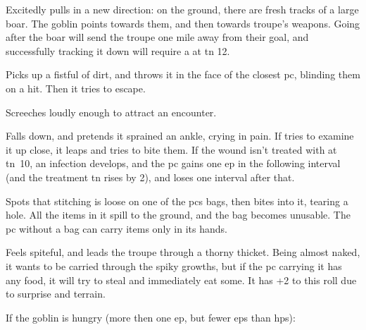 \documentclass[10pt,twoside]{book}
\begin{document}
\begin{dlist}
  \item
  Excitedly pulls in a new direction: on the ground, there are fresh tracks of a large boar.
  The goblin points towards them, and then towards troupe's weapons.
  Going after the boar will send the troupe one mile away from their goal, and successfully tracking it down will require a  at \gls{tn} 12.
  \item
  Picks up a fistful of dirt, and throws it in the face of the closest \gls{pc}, blinding them on a hit.
  Then it tries to escape.
  \item
  Screeches loudly enough to attract an encounter.
  \item
  Falls down, and pretends it sprained an ankle, crying in pain.
  If  tries to examine it up close, it leaps and tries to bite them.
  If the wound isn't treated with  at \gls{tn}~10, an infection develops, and the \gls{pc} gains one \gls{ep} in the following \gls{interval} (and the treatment \gls{tn} rises by 2), and loses  one \gls{interval} after that.
  \item
  Spots that stitching is loose on one of the \glspl{pc} bags, then bites into it, tearing a hole.
  All the items in it spill to the ground, and the bag becomes unusable.
  The \gls{pc} without a bag can carry items only in its hands.
  \item
  Feels spiteful, and leads the troupe through a thorny thicket.%
  Being almost naked, it wants to be carried through the spiky growths, but if the \gls{pc} carrying it has any food, it will try to steal and immediately eat some.
  It has +2 to this roll due to surprise and terrain.
\end{dlist}

If the goblin is hungry (more then one \gls{ep}, but fewer \glspl{ep} than \glspl{hp}):
\end{document}
